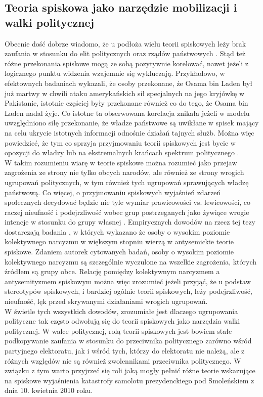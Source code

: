 \documentclass[man]{apa6}
\begin{document}
	\subsection{Teoria spiskowa jako narzędzie mobilizacji i walki politycznej}

	Obecnie dość dobrze wiadomo, że u podłoża wielu teorii spiskowych leży brak zaufania w stosunku do elit politycznych oraz rządów państwowych \parencite[zob. przegląd w,][]{van2014power}. Stąd też różne przekonania spiskowe mogą ze sobą pozytywnie korelować, nawet jeżeli z logicznego punktu widzenia wzajemnie się wykluczają. Przykładowo, \textcite{wood2012dead} w efektownych badaniach wykazali, że osoby przekonane, że Osama bin Laden był już martwy w chwili ataku amerykańskich sił specjalnych na jego kryjówkę w Pakistanie, istotnie częściej były przekonane również co do tego, że Osama bin Laden nadal żyje. Co istotne ta obserwowana korelacja znikała jeżeli w modelu uwzględniono siłę przekonanie, że władze państwowe są uwikłane w spisek mający na celu ukrycie istotnych informacji odnośnie działań tajnych służb. Można więc powiedzieć, że tym co sprzyja przyjmowaniu teorii spiskowych jest bycie w opozycji do władzy lub na ekstremalnych krańcach spektrum politycznego \parencite[patrz, np.,][]{inglehart1987extremist}.\\
	W takim rozumieniu wiarę w teorie spiskowe można rozumieć jako przejaw zagrożenia ze strony nie tylko obcych narodów, ale również ze strony wrogich ugrupowań politycznych, w tym również tych ugrupowań sprawujących władzę państwową. Co więcej, o przyjmowaniu spiskowych wyjaśnień zdarzeń społecznych decydować będzie nie tyle wymiar prawicowości vs. lewicowości, co raczej nieufność i podejrzliwość wobec grup postrzeganych jako żywiące wrogie intencje w stosunku do grupy własnej \parencite{prooijen2015mutual}. Empirycznych dowodów na rzecz tej tezy dostarczają badania \textcite{golec2012collective}, w których wykazano że osoby o wysokim poziomie kolektywnego narcyzmu w większym stopniu wierzą w antysemickie teorie spiskowe. Zdaniem autorek cytowanych badań, osoby o wysokim poziomie kolektywnego narcyzmu są szczególnie wyczulone na wszelkie zagrożenia, których źródłem są grupy obce. Relację pomiędzy kolektywnym narcyzmem a antysemityzmem spiskowym można więc zrozumieć jeżeli przyjąć, że u podstaw stereotypów spiskowych, i bardziej ogólnie teorii spiskowych, leży podejrzliwość, nieufność, lęk przed skrywanymi działaniami wrogich ugrupowań.\\
	W świetle tych wszystkich dowodów, zrozumiałe jest dlaczego ugrupowania polityczne tak często odwołują się do teorii spiskowych jako narzędzia walki politycznej. W walce politycznej, rolą teorii spiskowych jest bowiem stałe podkopywanie zaufania w stosunku do przeciwnika politycznego zarówno wśród partyjnego elektoratu, jak i wśród tych, którzy do elektoratu nie należą, ale z różnych względów nie są również zwolennikami przeciwnika politycznego. W związku z tym warto przyjrzeć się roli jaką mogły pełnić różne teorie wskazujące na spiskowe wyjaśnienia katastrofy samolotu prezydenckiego pod Smoleńskiem z dnia 10. kwietnia 2010 roku.\\
\end{document}
